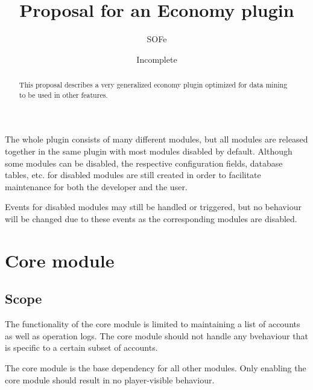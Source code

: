 \documentclass{report}
\title{Proposal for an Economy plugin}
\date{Incomplete}
\author{SOFe}
\begin{document}

	\maketitle

	\begin{abstract}
		This proposal describes a very generalized economy plugin optimized for data mining to be used in other features.
	\end{abstract}

	\tableofcontents

	The whole plugin consists of many different modules, but all modules are released together in the same plugin with most modules disabled by default.
	Although some modules can be disabled, the respective configuration fields, database tables, etc. for disabled modules are still created
	in order to facilitate maintenance for both the developer and the user.

	Events for disabled modules may still be handled or triggered,
	but no behaviour will be changed due to these events as the corresponding modules are disabled.

	\part{Core module}
		\chapter{Scope}

			The functionality of the core module is limited to maintaining a list of accounts as well as operation logs.
			The core module should not handle any bvehaviour that is specific to a certain subset of accounts.

			The core module is the base dependency for all other modules. Only enabling the core module should result in no player-visible behaviour.
\end{document}
